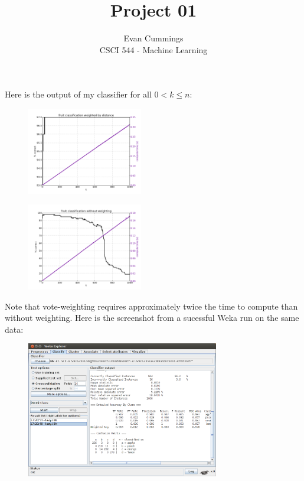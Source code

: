


\small

\title{Project 01}
\author{Evan Cummings\\
CSCI 544 - Machine Learning}

\maketitle

Here is the output of my classifier for all $0 < k \leq n$:

\begin{multicols}{2}
\begin{figure}[H]
  \centering
		\includegraphics[width=0.45\textwidth]{images/weights.png}
\end{figure}
\vspace{5mm}

\begin{figure}[H]
  \centering
		\includegraphics[width=0.45\textwidth]{images/no_weights.png}
\end{figure}
\vspace{5mm}
\end{multicols}

Note that vote-weighting requires approximately twice the time to compute than without weighting. Here is the screenshot from a sucessful Weka run on the same data:

\begin{figure}[H]
  \centering
		\includegraphics[width=0.75\textwidth]{images/weka.png}
\end{figure}
\vspace{5mm}




